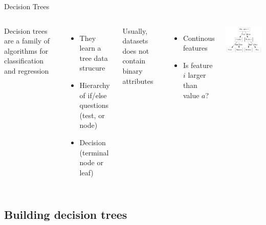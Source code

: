 \documentclass[10pt,compress]{beamer} %
\begin{document}
\begin{frame}{Decision Trees}
    \begin{columns}
            Decision trees are a family of algorithms for classification and regression
            \begin{itemize}
                \item They learn a tree data strucure
                \item Hierarchy of if/else questions (test, or node)
                \item Decision (terminal node or leaf)
            \end{itemize}

            Usually, datasets does not contain binary attributes
            \begin{itemize}
                \item Continous features
                \item Is feature $i$ larger than value $a$?
            \end{itemize}

            \centering \includegraphics[width=\linewidth]{figs/tree-game.png}
    \end{columns}
\end{frame}

\subsection{Building decision trees}
\end{document}
